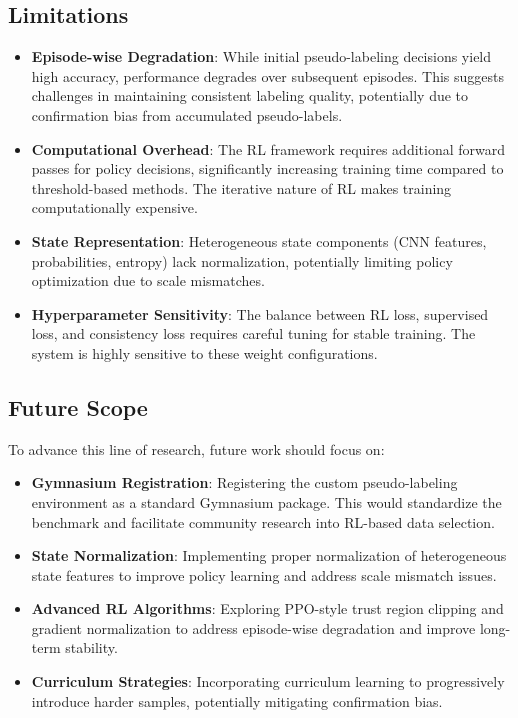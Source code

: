 \documentclass[pdflatex,sn-mathphys-num]{sn-jnl}%
\theoremstyle{thmstyleone}%
\theoremstyle{thmstyletwo}%
\theoremstyle{thmstylethree}%
\begin{document}
\subsection{Limitations}
\begin{itemize}
    \item \textbf{Episode-wise Degradation}: While initial pseudo-labeling decisions yield high accuracy, performance degrades over subsequent episodes. This suggests challenges in maintaining consistent labeling quality, potentially due to confirmation bias from accumulated pseudo-labels.
    \item \textbf{Computational Overhead}: The RL framework requires additional forward passes for policy decisions, significantly increasing training time compared to threshold-based methods. The iterative nature of RL makes training computationally expensive.
    \item \textbf{State Representation}: Heterogeneous state components (CNN features, probabilities, entropy) lack normalization, potentially limiting policy optimization due to scale mismatches.
    \item \textbf{Hyperparameter Sensitivity}: The balance between RL loss, supervised loss, and consistency loss requires careful tuning for stable training. The system is highly sensitive to these weight configurations.
\end{itemize}

\subsection{Future Scope}
To advance this line of research, future work should focus on:
\begin{itemize}
    \item \textbf{Gymnasium Registration}: Registering the custom pseudo-labeling environment as a standard Gymnasium package. This would standardize the benchmark and facilitate community research into RL-based data selection.
    \item \textbf{State Normalization}: Implementing proper normalization of heterogeneous state features to improve policy learning and address scale mismatch issues.
    \item \textbf{Advanced RL Algorithms}: Exploring PPO-style trust region clipping and gradient normalization to address episode-wise degradation and improve long-term stability.
    \item \textbf{Curriculum Strategies}: Incorporating curriculum learning to progressively introduce harder samples, potentially mitigating confirmation bias.
\end{itemize}


\end{document}
